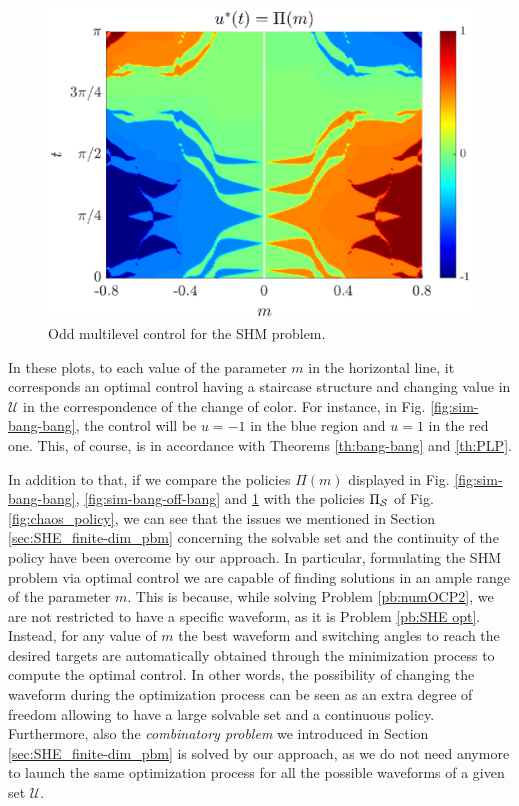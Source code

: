 \documentclass[9pt,shortpaper,twoside,web]{ieeecolor}
\begin{document}
\begin{figure}[ht!]
	\hspace{0.25em}
	\includegraphics[scale=0.5]{img/fig08.eps}
	\caption{Odd multilevel control for the SHM problem.}\label{fig:sim-multi-level}
\end{figure} 


In these plots, to each value of the parameter $m$ in the horizontal line, it corresponds an optimal control having a staircase structure and changing value in $\mathcal U$ in the correspondence of the change of color. For instance, in Fig. \ref{fig:sim-bang-bang}, the control will be $u=-1$ in the blue region and $u=1$ in the red one. This, of course, is in accordance with Theorems \ref{th:bang-bang} and \ref{th:PLP}.

In addition to that, if we compare the policies $\Pi(m)$ displayed in Fig. \ref{fig:sim-bang-bang}, \ref{fig:sim-bang-off-bang} and \ref{fig:sim-multi-level} with the policies $\Pi_{\mathcal{S}}$ of Fig. \ref{fig:chaos_policy}, we can see that the issues we mentioned in Section \ref{sec:SHE_finite-dim_pbm} concerning the solvable set and the continuity of the policy have been overcome by our approach. In particular, formulating the SHM problem via optimal control we are capable of finding solutions in an ample range of the parameter $m$. This is because, while solving Problem \ref{pb:numOCP2}, we are not restricted to have a specific waveform, as it is Problem \ref{pb:SHE opt}. Instead, for any value of $m$ the best waveform and switching angles to reach the desired targets are automatically obtained through the minimization process to compute the optimal control. In other words, the possibility of changing the waveform during the optimization process can be seen as an extra degree of freedom allowing to have a large solvable set and a continuous policy. Furthermore, also the \textit{combinatory problem} we introduced in Section \ref{sec:SHE_finite-dim_pbm} is solved by our approach, as we do not need anymore to launch the same optimization process for all the possible waveforms of a given set $\mathcal U$. 
\end{document}
